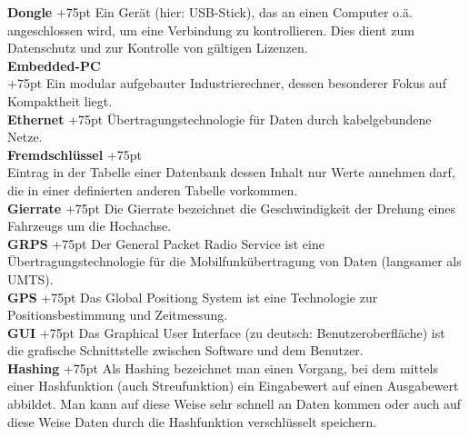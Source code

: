 \documentclass[fontsize = 12pt, paper = a4]{scrreprt}
\begin{document}
\textbf{Dongle}
\hangindent+75pt 
\hspace*{8.75mm}
Ein Gerät (hier: USB-Stick), das an einen Computer o.ä. angeschlossen wird, um eine Verbindung zu kontrollieren. Dies dient zum Datenschutz und zur Kontrolle von gültigen Lizenzen.\\

\textbf{Embedded-PC} \\
\hangindent+75pt  
Ein modular aufgebauter Industrierechner, dessen besonderer Fokus auf Kompaktheit liegt.\\

\textbf{Ethernet}
\hangindent+75pt 
\hspace*{5.5mm}
Übertragungstechnologie für Daten durch kabelgebundene Netze.\\

\textbf{Fremdschlüssel}
\hangindent+75pt 
\\
Eintrag in der Tabelle einer Datenbank dessen Inhalt nur Werte annehmen darf, die in einer definierten anderen Tabelle vorkommen.\\

\textbf{Gierrate}
\hangindent+75pt 
\hspace*{6.5mm}
Die Gierrate bezeichnet die Geschwindigkeit der Drehung eines Fahrzeugs um die Hochachse.\\

\textbf{GRPS}
\hangindent+75pt 
\hspace*{10.5mm}
Der General Packet Radio Service ist eine Übertragungstechnologie für die Mobilfunkübertragung von Daten (langsamer als UMTS).\\

\textbf{GPS}
\hangindent+75pt 
\hspace*{14mm}
Das Global Positiong System ist eine Technologie zur Positionsbestimmung und Zeitmessung.\\

\textbf{GUI}
\hangindent+75pt 
\hspace*{14.5mm}
Das Graphical User Interface (zu deutsch: Benutzeroberfläche) ist die grafische Schnittstelle zwischen Software und dem Benutzer.\\

\textbf{Hashing}
\hangindent+75pt   
\hspace*{6.5mm}
Als Hashing bezeichnet man einen Vorgang, bei dem mittels einer Hashfunktion (auch Streufunktion) ein Eingabewert auf einen Ausgabewert abbildet. Man kann auf diese Weise sehr schnell an Daten kommen oder auch auf diese Weise Daten durch die Hashfunktion verschlüsselt speichern.\\
\end{document}
